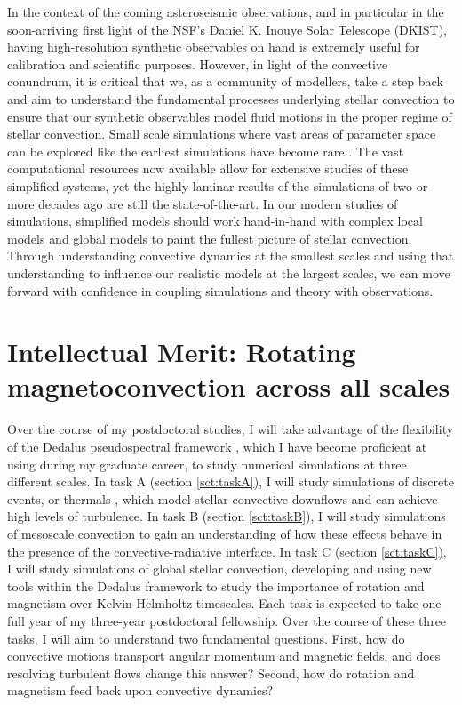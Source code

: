 \documentclass[aasms,11pt, longbibliography]{article}
\makeatletter
\renewcommand{\sectionmark}[1]{%
  \markboth{\ifnum \c@secnumdepth>\z@
      \thesection: \hskip 1em\relax
    \fi #1}{}}
\makeatother
\begin{document}
In the context of the coming asteroseismic observations, and in particular in the soon-arriving first light of the NSF's Daniel K. Inouye Solar Telescope (DKIST), having high-resolution synthetic observables on hand is extremely useful for calibration and scientific purposes.
However, in light of the convective conundrum, it is critical that we, as a community of modellers, take a step back and aim to understand the fundamental processes underlying stellar convection to ensure that our synthetic observables model fluid motions in the proper regime of stellar convection.
Small scale simulations where vast areas of parameter space can be explored like the earliest simulations have become rare \citep{wood&brummell2012, wood&brummell2018}.
The vast computational resources now available allow for extensive studies of these simplified systems, yet the highly laminar results of the simulations of two or more decades ago are still the state-of-the-art.
In our modern studies of simulations, simplified models \citep{brummell&all1998} should work hand-in-hand with complex local models \citep{rempel2014} and global models \citep{strugarek&all2018} to paint the fullest picture of stellar convection.
Through understanding convective dynamics at the smallest scales and using that understanding to influence our realistic models at the largest scales, we can move forward with confidence in coupling simulations and theory with observations.

\section{Intellectual Merit: Rotating magnetoconvection across all scales}
\sectionmark{Intellectual Merit}
\vspace{-6pt}

\label{sct:intellectual_merit}

Over the course of my postdoctoral studies, I will take advantage of the flexibility of the Dedalus pseudospectral framework \citep{burns&all2019}, which I have become proficient at using during my graduate career, to study numerical simulations at three different scales.
In task A (section \ref{sct:taskA}), I will study simulations of discrete events, or thermals \citep[as in ][]{andersLB2019}, which model stellar convective downflows and can achieve high levels of turbulence.
In task B (section \ref{sct:taskB}), I will study simulations of mesoscale convection \citep[as in ][]{anders&brown2017} to gain an understanding of how these effects behave in the presence of the convective-radiative interface.
In task C (section \ref{sct:taskC}), I will study simulations of global stellar convection, developing and using new tools within the Dedalus framework to study the importance of rotation and magnetism over Kelvin-Helmholtz timescales.
Each task is expected to take one full year of my three-year postdoctoral fellowship.
Over the course of these three tasks, I will aim to understand two fundamental questions.
First, how do convective motions transport angular momentum and magnetic fields, and does resolving turbulent flows change this answer?
Second, how do rotation and magnetism feed back upon convective dynamics?
\end{document}
